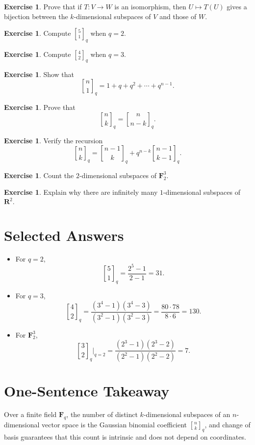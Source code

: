 \documentclass[11pt]{article}
\theoremstyle{definition}
\newtheorem{exercise}[theorem]{Exercise}
\theoremstyle{remark}
\newcommand{\F}{\mathbf{F}}
\newcommand{\R}{\mathbf{R}}
\newcommand{\qbinom}[2]{\genfrac{[}{]}{0pt}{}{#1}{#2}_q}
\begin{document}
	\begin{exercise}
		Prove that if \(T:V\to W\) is an isomorphism, then \(U\mapsto T(U)\) gives a bijection between the \(k\)-dimensional subspaces of \(V\) and those of \(W\).
	\end{exercise}
	
	\begin{exercise}
		Compute \(\qbinom{5}{1}\) when \(q=2\).
	\end{exercise}
	
	\begin{exercise}
		Compute \(\qbinom{4}{2}\) when \(q=3\).
	\end{exercise}
	
	\begin{exercise}
		Show that
		\[
		\qbinom{n}{1}=1+q+q^2+\cdots+q^{n-1}.
		\]
	\end{exercise}
	
	\begin{exercise}
		Prove that
		\[
		\qbinom{n}{k}=\qbinom{n}{n-k}.
		\]
	\end{exercise}
	
	\begin{exercise}
		Verify the recursion
		\[
		\qbinom{n}{k}
		=
		\qbinom{n-1}{k}
		+
		q^{n-k}\qbinom{n-1}{k-1}.
		\]
	\end{exercise}
	
	\begin{exercise}
		Count the \(2\)-dimensional subspaces of \(\F_2^3\).
	\end{exercise}
	
	\begin{exercise}
		Explain why there are infinitely many \(1\)-dimensional subspaces of \(\R^2\).
	\end{exercise}
	
	\section{Selected Answers}
	
	\begin{itemize}
		\item For \(q=2\),
		\[
		\qbinom{5}{1}=\frac{2^5-1}{2-1}=31.
		\]
		
		\item For \(q=3\),
		\[
		\qbinom{4}{2}
		=
		\frac{(3^4-1)(3^4-3)}{(3^2-1)(3^2-3)}
		=
		\frac{80\cdot 78}{8\cdot 6}
		=
		130.
		\]
		
		\item For \(\F_2^3\),
		\[
		\qbinom{3}{2}\Big|_{q=2}
		=
		\frac{(2^3-1)(2^3-2)}{(2^2-1)(2^2-2)}
		=
		7.
		\]
	\end{itemize}
	
	\section*{One-Sentence Takeaway}
	
	Over a finite field \(\F_q\), the number of distinct \(k\)-dimensional subspaces of an \(n\)-dimensional vector space is the Gaussian binomial coefficient \(\qbinom{n}{k}\), and change of basis guarantees that this count is intrinsic and does not depend on coordinates.
	
\end{document}
